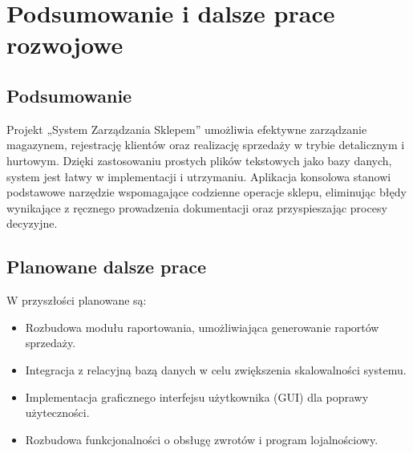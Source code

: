 \chapter{Podsumowanie i dalsze prace rozwojowe}
\section{Podsumowanie}
Projekt „System Zarządzania Sklepem” umożliwia efektywne zarządzanie magazynem, rejestrację klientów oraz realizację sprzedaży w trybie detalicznym i hurtowym. Dzięki zastosowaniu prostych plików tekstowych jako bazy danych, system jest łatwy w implementacji i utrzymaniu. Aplikacja konsolowa stanowi podstawowe narzędzie wspomagające codzienne operacje sklepu, eliminując błędy wynikające z ręcznego prowadzenia dokumentacji oraz przyspieszając procesy decyzyjne.

\section{Planowane dalsze prace}
W przyszłości planowane są:
\begin{itemize}
    \item Rozbudowa modułu raportowania, umożliwiająca generowanie raportów sprzedaży.
    \item Integracja z relacyjną bazą danych w celu zwiększenia skalowalności systemu.
    \item Implementacja graficznego interfejsu użytkownika (GUI) dla poprawy użyteczności.
    \item Rozbudowa funkcjonalności o obsługę zwrotów i program lojalnościowy.
\end{itemize}



